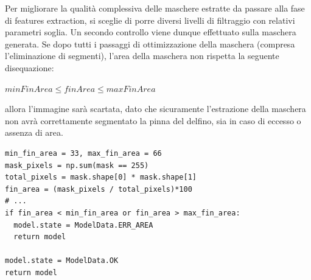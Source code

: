 \documentclass[a4paper,12pt]{report}
\begin{document}
    Per migliorare la qualità complessiva delle maschere estratte da passare alla fase di features extraction,
    si sceglie di porre diversi livelli di filtraggio con relativi parametri soglia.
    Un secondo controllo viene dunque effettuato sulla maschera generata. Se 
    dopo tutti i passaggi di ottimizzazione della maschera (compresa l'eliminazione di
    segmenti), l'area della maschera non rispetta la seguente disequazione:
    \begin{minipage}{1\textwidth}
      \centering
      $minFinArea \leq finArea \leq maxFinArea$
    \end{minipage}
    
    allora l'immagine sarà scartata, dato che sicuramente l'estrazione della maschera
    non avrà correttamente segmentato la pinna del delfino, sia in caso di eccesso o assenza di area.
    
    \begin{lstlisting}
min_fin_area = 33, max_fin_area = 66
mask_pixels = np.sum(mask == 255)
total_pixels = mask.shape[0] * mask.shape[1]
fin_area = (mask_pixels / total_pixels)*100
# ...
if fin_area < min_fin_area or fin_area > max_fin_area:
  model.state = ModelData.ERR_AREA
  return model

model.state = ModelData.OK
return model
    \end{lstlisting}
    \newpage
   
\end{document}
